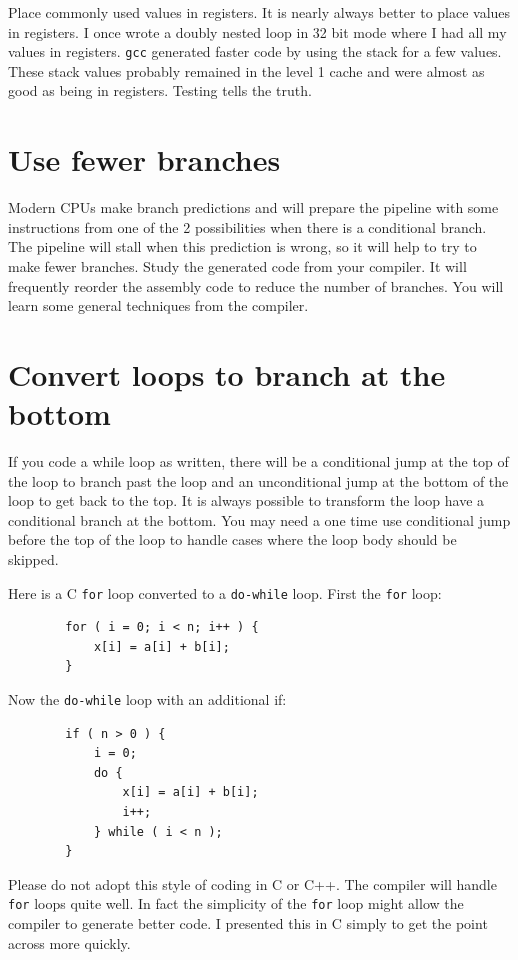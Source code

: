\documentclass[11pt,b5paper]{book}
\begin{document}
Place commonly used values in registers.
It is nearly always better to place values in registers.
I once wrote a doubly nested loop in 32 bit mode where I had all my values in
registers.
{\tt gcc} generated faster code by using the stack for a few values.
These stack values probably remained in the level 1 cache and were almost as
good as being in registers.
Testing tells the truth.

\section{Use fewer branches}

Modern CPUs make branch predictions and will prepare the pipeline with
some instructions from one of the 2 possibilities when there is a conditional
branch.
The pipeline will stall when this prediction is wrong, so it will help
to try to make fewer branches.
Study the generated code from your compiler.
It will frequently reorder the assembly code to reduce the number of
branches.
You will learn some general techniques from the compiler.

\section{Convert loops to branch at the bottom}

If you code a while loop as written, there will be a conditional jump
at the top of the loop to branch past the loop and an unconditional jump at the bottom of the loop
to get back to the top.
It is always possible to transform the loop have a conditional branch at the
bottom.
You may need a one time use conditional jump before the top of the loop to handle
cases where the loop body should be skipped.

Here is a C {\tt for} loop converted to a {\tt do-while} loop.
First the {\tt for} loop:
\begin{verbatim}
        for ( i = 0; i < n; i++ ) {
            x[i] = a[i] + b[i];
        }
\end{verbatim}

Now the {\tt do-while} loop with an additional if:
\begin{verbatim}
        if ( n > 0 ) {
            i = 0;
            do {
                x[i] = a[i] + b[i];
                i++;
            } while ( i < n );
        }
\end{verbatim}

Please do not adopt this style of coding in C or C++.
The compiler will handle {\tt for} loops quite well.
In fact the simplicity of the {\tt for} loop might allow the compiler
to generate better code.
I presented this in C simply to get the point across more quickly.
\end{document}
